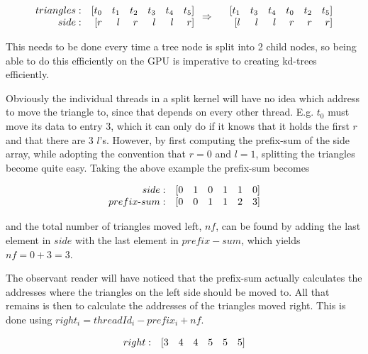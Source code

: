 \begin{displaymath}
  \begin{array} {r r r r r r r}
    triangles: & [t_0 & t_1 & t_2 & t_3 & t_4 & t_5]\\
    side: & [r & l & r & l & l & r]\\
  \end{array}
  \Rightarrow
  \begin{array} {r r r r r r r}
    &[t_1 & t_3 & t_4 & t_0 & t_2 & t_5]\\
    &[l & l & l & r & r & r]\\
  \end{array}
\end{displaymath}

This needs to be done every time a tree node is split into 2 child
nodes, so being able to do this efficiently on the GPU is imperative
to creating kd-trees efficiently.

Obviously the individual threads in a split kernel will have no idea
which address to move the triangle to, since that depends on every
other thread. E.g. $t_0$ must move its data to entry 3, which it can
only do if it knows that it holds the first $r$ and that there are 3
$l$'s. However, by first computing the prefix-sum of the side array,
while adopting the convention that $r = 0$ and $l = 1$, splitting the
triangles become quite easy. Taking the above example the prefix-sum
becomes

\begin{displaymath}
  \begin{array} {r r r r r r r}
    side: & [0 & 1 & 0 & 1 & 1 & 0]\\
    prefix\text{-}sum: & [0 & 0 & 1 & 1 & 2 & 3]
  \end{array}
\end{displaymath}

and the total number of triangles moved left, $nf$, can be found by
adding the last element in $side$ with the last element in $prefix-sum$,
which yields $nf = 0 + 3 = 3$.

The observant reader will have noticed that the prefix-sum actually
calculates the addresses where the triangles on the left side should
be moved to. All that remains is then to calculate the addresses of
the triangles moved right. This is done using $right_i = threadId_i -
prefix_i + nf$.

\begin{displaymath}
  \begin{array} {r r r r r r r}
    right: & [3 & 4 & 4 & 5 & 5 & 5]
  \end{array}
\end{displaymath}

